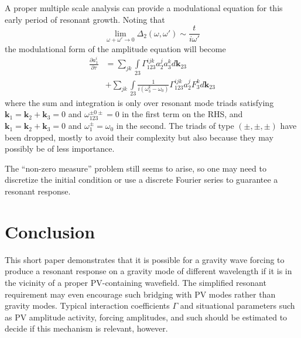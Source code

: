 \documentclass[letterpaper, 11pt]{article}
\newcommand{\pdiff}[2]{\frac{\partial #1}{\partial #2}}
\begin{document}
A proper multiple scale analysis can provide a modulational equation for this early period of resonant growth. Noting that
\begin{equation}
\lim_{\omega+\omega' \rightarrow 0}\Delta_2(\omega, \omega') \sim \frac{t}{i \omega'}
\end{equation}
the modulational form of the amplitude equation will become
\begin{equation}
\begin{split}
\pdiff{a^i_1}{\tau} &= \sum_{jk}\int\limits_{23} \Gamma^{ijk}_{123} a^j_2 a^k_3 d\mathbf{k}_{23} \\
&+ \sum_{jk} \int\limits_{23} \frac{1}{i (\omega^k_3 - \omega_0)} \Gamma^{ijk}_{123} a^j_2 F^k_3 d\mathbf{k}_{23}
\end{split}
\end{equation}
where the sum and integration is only over resonant mode triads satisfying $\mathbf{k}_1 = \mathbf{k}_2 + \mathbf{k}_3 = 0$ and $\omega^{\pm0\pm}_{123} = 0$ in the first term on the RHS, and $\mathbf{k}_1 = \mathbf{k}_2 + \mathbf{k}_3 = 0$ and $\omega^\pm_1 = \omega_0$ in the second. The triads of type $(\pm, \pm, \pm)$ have been dropped, mostly to avoid their complexity but also because they may possibly be of less importance.

The ``non-zero measure'' problem still seems to arise, so one may need to discretize the initial condition or use a discrete Fourier series to guarantee a resonant response.

\section{Conclusion}

This short paper demonstrates that it is possible for a gravity wave forcing to produce a resonant response on a gravity mode of different wavelength if it is in the vicinity of a proper PV-containing wavefield. The simplified resonant requirement may even encourage such bridging with PV modes rather than gravity modes. Typical interaction coefficients $\Gamma$ and situational parameters such as PV amplitude activity, forcing amplitudes, and such should be estimated to decide if this mechanism is relevant, however.

\end{document}
